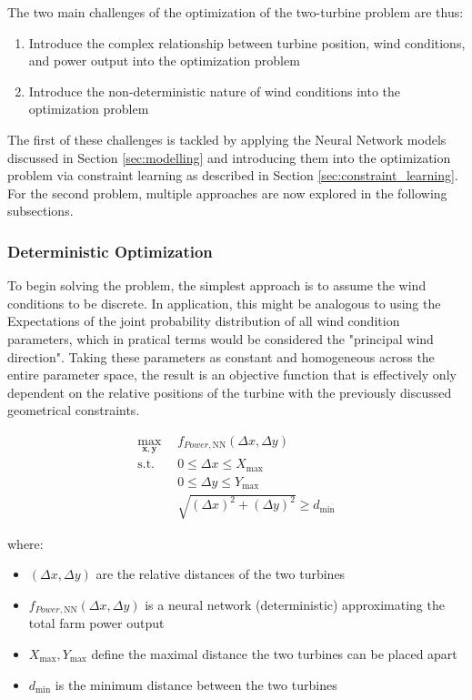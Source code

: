 \documentclass[preprint,12pt]{elsarticle}
\begin{document}
The two main challenges of the optimization of the two-turbine problem are thus: 

\begin{enumerate}
	\item Introduce the complex relationship between turbine position, wind conditions, and power output into the optimization problem
	\item Introduce the non-deterministic nature of wind conditions into the optimization problem
\end{enumerate}

The first of these challenges is tackled by applying the Neural Network models discussed in Section \ref{sec:modelling} and introducing them into the optimization problem via constraint learning as described in Section \ref{sec:constraint_learning}. For the second problem, multiple approaches are now explored in the following subsections.


\subsubsection{Deterministic Optimization}

To begin solving the problem, the simplest approach is to assume the wind conditions to be discrete. In application, this might be analogous to using the Expectations of the joint probability distribution of all wind condition parameters, which in pratical terms would be considered the "principal wind direction". Taking these parameters as constant and homogeneous across the entire parameter space, the result is an objective function that is effectively only dependent on the relative positions of the turbine with the previously discussed geometrical constraints.

\begin{align}
	\max_{\mathbf{x}, \mathbf{y}} & f_{Power,\text{NN}}(\Delta x, \Delta y) \\
	\text{s.t.} \quad 
	&  0 \leq \Delta x \leq X_{\max} \\
	&  0 \leq \Delta y \leq Y_{\max} \\
	& \sqrt{(\Delta x)^2 + (\Delta y)^2} \geq d_{\min}
\end{align}

where:
\begin{itemize}
	\item \( (\Delta x, \Delta y) \) are the relative distances of the two turbines
	\item \( f_{Power, \text{NN}}(\Delta x, \Delta y)\) is a neural network (deterministic) approximating the total farm power output
	\item \(  X_{\max}, Y_{\max} \) define the maximal distance the two turbines can be placed apart
	\item \( d_{\min} \) is the minimum distance between the two turbines
\end{itemize}
\end{document}
